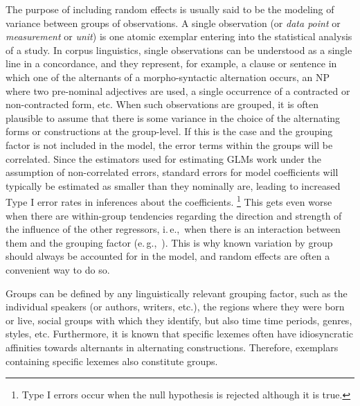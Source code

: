 \documentclass[a4paper,12pt]{article}
\newcommand{\ie}{i.\,e.,\ }
\newcommand{\eg}{e.\,g.,\ }
\begin{document}
The purpose of including random effects is usually said to be the modeling of variance between groups of observations.
A single observation (or \textit{data point} or \textit{measurement} or \textit{unit}) is one atomic exemplar entering into the statistical analysis of a study.
In corpus linguistics, single observations can be understood as a single line in a concordance, and they represent, for example, a clause or sentence in which one of the alternants of a morpho-syntactic alternation occurs, an NP where two pre-nominal adjectives are used, a single occurrence of a contracted or non-contracted form, etc.
When such observations are grouped, it is often plausible to assume that there is some variance in the choice of the alternating forms or constructions at the group-level.
If this is the case and the grouping factor is not included in the model, the error terms within the groups will be correlated.
Since the estimators used for estimating GLMs work under the assumption of non-correlated errors, standard errors for model coefficients will typically be estimated as smaller than they nominally are, leading to increased Type I error rates in inferences about the coefficients.%
\footnote{Type I errors occur when the null hypothesis is rejected although it is true.}
This gets even worse when there are within-group tendencies regarding the direction and strength of the influence of the other regressors, \ie when there is an interaction between them and the grouping factor (\eg \citealt{SchielzethForstmeier2009}).
This is why known variation by group should always be accounted for in the model, and random effects are often a convenient way to do so.

Groups can be defined by any linguistically relevant grouping factor, such as the individual speakers (or authors, writers, etc.), the regions where they were born or live, social groups with which they identify, but also time time periods, genres, styles, etc.
Furthermore, it is known that specific lexemes often have idiosyncratic affinities towards alternants in alternating constructions.
Therefore, exemplars containing specific lexemes also constitute groups.
\end{document}
